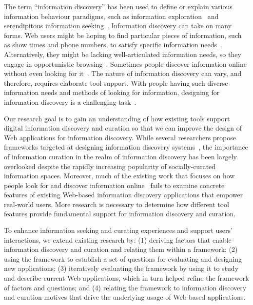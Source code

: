 \documentclass[review]{elsarticle}
\begin{document}
The term ``information discovery'' has been used to define or explain various information behaviour paradigms, such as information exploration~\cite{waterworth1991model} and serendipitous information seeking~\cite{foster2003serendipity}.  
Information discovery can take on many forms. Web users might be hoping to find particular pieces of information, such as show times and phone numbers, to satisfy specific information needs~\cite{proper1999information}. Alternatively, they might be lacking well-articulated information needs, so they engage in opportunistic browsing~\cite{lindley2012s}. Sometimes people discover information online without even looking for it~\cite{bates1986exploratory}. The nature of information discovery can vary, and therefore, requires elaborate tool support. With people having such diverse information needs and methods of looking for information, designing for information discovery is a challenging task~\cite{conaway2010designing, marchionini2006exploratory}.

Our research goal is to gain an understanding of how existing tools support digital information discovery and curation so that we can improve the design of Web applications for information discovery. While several researchers propose frameworks targeted at designing information discovery systems~\cite{proper1999information, kerne2004information}, the importance of information curation in the realm of information discovery has been largely overlooked despite the rapidly increasing popularity of socially-curated information spaces. Moreover, much of the existing work that focuses on how people look for and discover information online~\cite{bates1986exploratory, choo2000information, ellis1989behavioural, kellar2006goal, lindley2012s, morrison2001taxonomic, sellen2002knowledge} fails to examine concrete features of existing Web-based information discovery applications that empower real-world users. More research is necessary to determine how different tool features provide fundamental support for information discovery and curation.

To enhance information seeking and curating experiences and support users' interactions, we extend existing research by: (1) deriving factors that enable information discovery and curation and relating them within a framework; (2) using the framework to establish a set of questions for evaluating and designing new applications; (3) iteratively evaluating the framework by using it to study and describe current Web applications, which in turn helped refine the framework of factors and questions; and (4) relating the framework to information discovery and curation motives that drive the underlying usage of Web-based applications.
\end{document}
